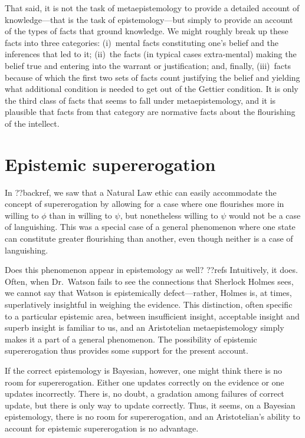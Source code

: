 That said, it is not the task of metaepistemology to provide a detailed account of knowledge---that is the task of epistemology---but simply
to provide an account of the types of facts that ground knowledge. We might roughly break up these facts into three categories:
(i)~mental facts constituting one's belief and the inferences that led to it; (ii)~the facts (in typical cases extra-mental) making the 
belief true and entering into the warrant or justification; and, finally, (iii)~facts because of which the first two sets of
facts count justifying the belief and yielding what additional condition is needed to get out of the Gettier condition. It is only
the third class of facts that seems to fall under metaepistemology, and it is plausible that facts from that category are normative 
facts about the flourishing of the intellect. 

\section{Epistemic supererogation}
In ??backref, we saw that a Natural Law ethic can easily accommodate the concept of supererogation by allowing for a case
where one flourishes more in willing to $\phi$ than in willing to $\psi$, but nonetheless willing to $\psi$ would not be a case of languishing. This was
a special case of a general phenomenon where one state can constitute greater flourishing than another, even though neither
is a case of languishing. 

Does this phenomenon appear in epistemology as well? ??refs  Intuitively, it does. Often, when Dr.~Watson fails to see the 
connections that Sherlock Holmes sees, we cannot say that Watson is epistemically defect---rather, Holmes is, at times, 
superlatively insightful in weighing the evidence. This distinction, often specific to a particular epistemic area, between
insufficient insight, acceptable insight and superb insight is familiar to us, and an Aristotelian metaepistemology simply
makes it a part of a general phenomenon. The possibility of epistemic supererogation thus provides some support for the 
present account.

If the correct epistemology is Bayesian, however, one might think there is no room for supererogation. Either one updates
correctly on the evidence or one updates incorrectly. There is, no doubt, a gradation among failures of correct update, 
but there is only way to update correctly.  Thus, it seems, on a Bayesian epistemology, there is no room for supererogation,
and an Aristotelian's ability to account for epistemic supererogation is no advantage.


